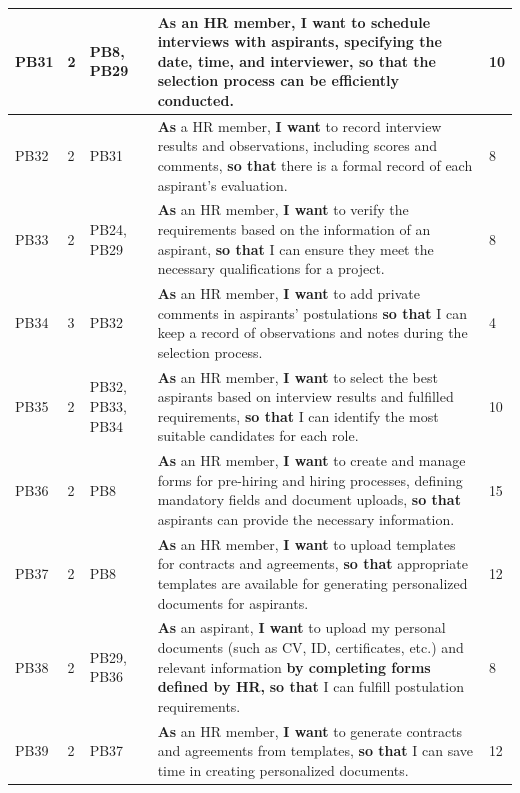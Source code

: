 \documentclass{scrreprt}
\begin{document}
\begin{longtable}{|p{0.8cm}|p{1.5cm}|p{2.5cm}|p{8cm}|p{2cm}|}
	PB31& 2 & PB8, PB29& \textbf{As} an HR member, \textbf{I want} to schedule interviews with aspirants, specifying the date, time, and interviewer, \textbf{so that} the selection process can be efficiently conducted. & 10 \\ \hline
	PB32 & 2 & PB31 & \textbf{As} a HR member, \textbf{I want} to record interview results and observations, including scores and comments, \textbf{so that} there is a formal record of each aspirant's evaluation. & 8 \\ \hline
	PB33 & 2 & PB24, PB29 & \textbf{As} an HR member, \textbf{I want} to verify the requirements based on the information of an aspirant, \textbf{so that} I can ensure they meet the necessary qualifications for a project. & 8 \\ \hline
	PB34& 3 & PB32 & \textbf{As} an HR member, \textbf{I want} to add private comments in aspirants' postulations \textbf{so that} I can keep a record of observations and notes during the selection process. & 4 \\ \hline
	PB35 & 2 & PB32, PB33, PB34 & \textbf{As} an HR member, \textbf{I want} to select the best aspirants based on interview results and fulfilled requirements, \textbf{so that} I can identify the most suitable candidates for each role. & 10 \\ \hline
	
	PB36 & 2 & PB8 & \textbf{As} an HR member, \textbf{I want} to create and manage forms for pre-hiring and hiring processes, defining mandatory fields and document uploads, \textbf{so that} aspirants can provide the necessary information. & 15 \\ \hline
	PB37 & 2 & PB8 & \textbf{As} an HR member, \textbf{I want} to upload templates for contracts and agreements, \textbf{so that} appropriate templates are available for generating personalized documents for aspirants. & 12 \\ \hline
	PB38 & 2 & PB29, PB36 & \textbf{As} an aspirant, \textbf{I want} to upload my personal documents (such as CV, ID, certificates, etc.) and relevant information \textbf{by completing forms defined by HR,} \textbf{so that} I can fulfill postulation requirements. & 8 \\ \hline
	PB39 & 2 & PB37 & \textbf{As} an HR member, \textbf{I want} to generate contracts and agreements from templates, \textbf{so that} I can save time in creating personalized documents. & 12 \\ \hline
	

\end{longtable}
\end{document}
